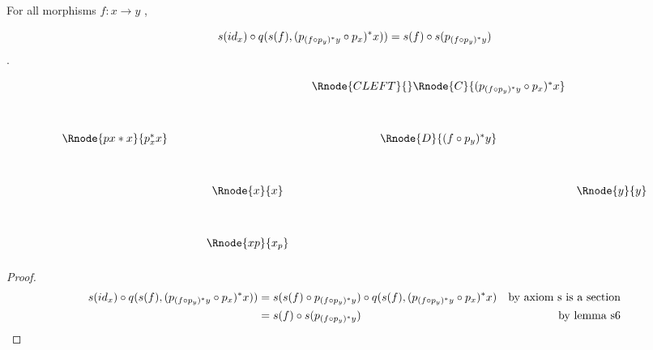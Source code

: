 \documentclass[10pt,a4paper]{scrartcl}
\begin{document}
\begin{lemma} [lemma 30v]
\label{30v}  
For all morphisms $f: x \rightarrow y$ ,

$$s(id_x) \circ q(s(f),(p_{(f \circ p_y) ^* y} \circ p_x) ^* x)) = s(f) \circ s( p_{(f \circ p_y) ^* y} )$$.
\begin{center}
\begin{displaymath}
\begin{array}{c p{.5cm} c p{.01cm} c c}
                   &&&& \Rnode{CLEFT}{}\Rnode{C}{(p_{(f \circ p_y) \sub y} \circ p_x) \sub x}  \\ [1.2cm]
\Rnode{px*x}{p_x \sub x} &&&& \Rnode{D}{(f \circ p_y) \sub y}  \\ [1.2cm]
           && \Rnode{x}{x} &&& \Rnode{y}{y} \\ [1.2cm]
					&& \Rnode{xp}{x_p} \\ [0.2cm]  
\end{array}
\end{displaymath}



\end{center}
\end{lemma}
\begin{proof}
\begin{align*}
s(id_x) \circ q(s(f),(p_{(f \circ p_y) ^* y} \circ p_x) ^* x))
    & = s(s(f) \circ p_{(f \circ p_y) ^* y}) \circ q(s(f), (p_{(f \circ p_y) ^* y} \circ p_x) ^* x) &\mbox{by axiom s is a section}\\
    & = s(f) \circ s( p_{(f \circ p_y) ^* y} )&\mbox{by lemma s6}\\
\end{align*}
\end{proof}



 
\end{document}
